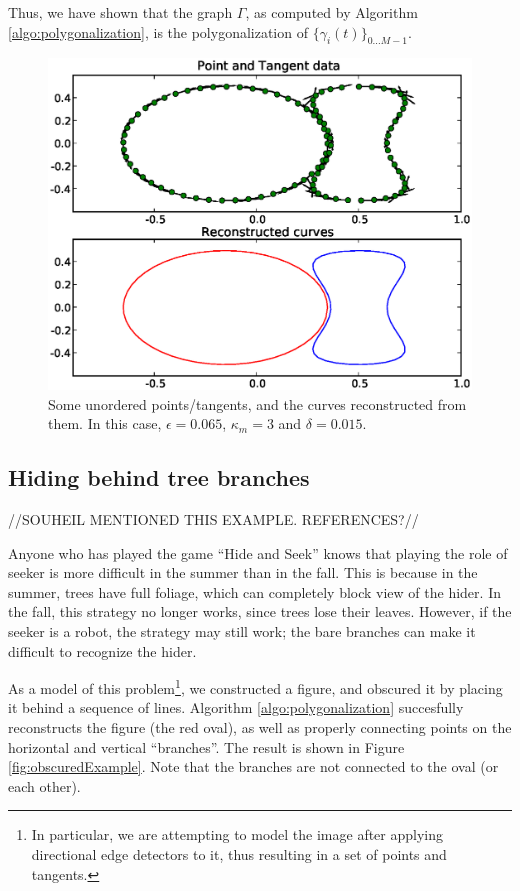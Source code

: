 \documentclass{article}
\numberwithin{cntr}{section}
\numberwithin{equation}{section}
\newcommand{\Oto}[1]{{0 \ldots #1-1}}
\newcommand{\curveSet}{{ \{ \gamma_i(t) \}_{\Oto{M}}}}
\newcommand{\curvemax}{{\kappa_{m}}}
\begin{document}
Thus, we have shown that the graph $\Gamma$, as computed by Algorithm \ref{algo:polygonalization}, is the polygonalization of $\curveSet$.

\begin{figure}
\setlength{\unitlength}{0.240900pt}
\ifx\plotpoint\undefined\newsavebox{\plotpoint}\fi
\sbox{\plotpoint}{\rule[-0.200pt]{0.400pt}{0.400pt}}%
\includegraphics[scale=0.5]{example1.eps}

\caption{Some unordered points/tangents, and the curves reconstructed from them. In this case, $\epsilon=0.065$, $\curvemax=3$ and $\delta=0.015$.}
\label{fig:basicExample}
\end{figure}

\subsection{Hiding behind tree branches}

//SOUHEIL MENTIONED THIS EXAMPLE. REFERENCES?//

Anyone who has played the game ``Hide and Seek'' knows that playing the role of seeker is more difficult in the summer than in the fall. This is because in the summer, trees have full foliage, which can completely block view of the hider. In the fall, this strategy no longer works, since trees lose their leaves. However, if the seeker is a robot, the strategy may still work; the bare branches can make it difficult to recognize the hider.

As a model of this problem\footnote{In particular, we are attempting to model the image after applying directional edge detectors to it, thus resulting in a set of points and tangents.}, we constructed a figure, and obscured it by placing it behind a sequence of lines. Algorithm \ref{algo:polygonalization} succesfully reconstructs the figure (the red oval), as well as properly connecting points on the horizontal and vertical ``branches''. The result is shown in Figure \ref{fig:obscuredExample}. Note that the branches are not connected to the oval (or each other).
\end{document}
